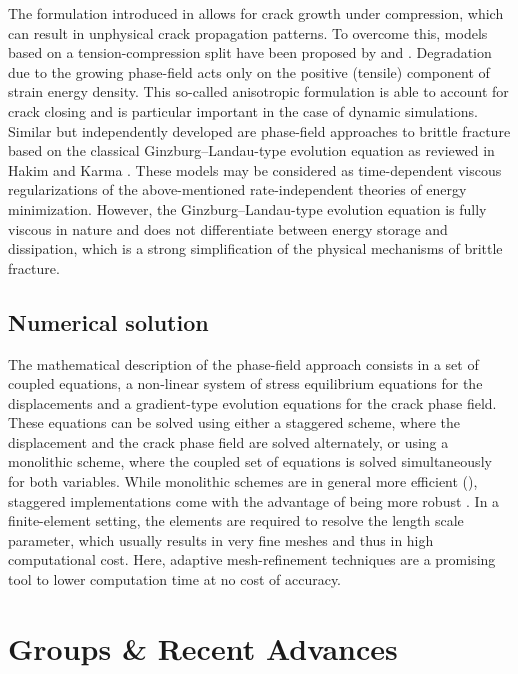 The formulation introduced in \cite{bour2008} allows for crack growth under compression, which can result in unphysical crack propagation patterns. To overcome this, models based on a tension-compression split have been proposed by \cite{amor2009regularized} and \cite{miehe2010thermodynamically}. Degradation due to the growing phase-field acts only on the positive (tensile) component of strain energy density. This so-called anisotropic formulation is able to account for crack closing and is particular important in the case of dynamic simulations. 
Similar but independently developed are phase-field approaches to brittle fracture based on the classical Ginzburg–Landau-type evolution equation as reviewed in Hakim and Karma \cite{hakim2009laws}. These models may be considered as time-dependent viscous regularizations of the above-mentioned rate-independent theories of energy minimization. However, the Ginzburg–Landau-type evolution equation is fully viscous in nature and does not differentiate between energy storage and dissipation, which is a strong simplification of the physical mechanisms of brittle fracture. 

\section{Numerical solution} 
The mathematical description of the phase-field approach consists in a set of coupled equations, a non-linear system of stress equilibrium equations for the displacements and a gradient-type evolution equations for the crack phase field. These equations can be solved using either a staggered scheme, where the displacement and the crack phase field are solved alternately, or using a monolithic scheme, where the coupled set of equations is solved simultaneously for both variables. While monolithic schemes are in general more efficient (\cite{gerasimov2016line}), staggered implementations come with the advantage of being more robust \cite{miehe2010phase}. In a finite-element setting, the elements are required to resolve the length scale parameter, which usually results in very fine meshes and thus in high computational cost. Here, adaptive mesh-refinement techniques are a promising tool to lower computation time at no cost of accuracy.


\chapter{Groups \& Recent Advances}
